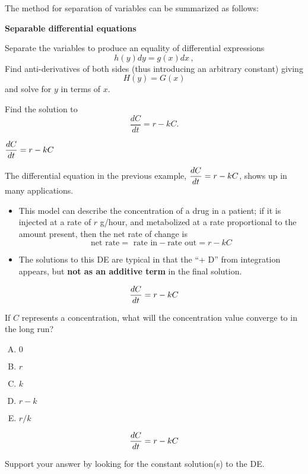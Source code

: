 \documentclass[12pt]{amsart}
\begin{document}
\newpage
{}
The method for separation of variables can be summarized as follows:

\begin{boxnote}
{\bf Separable differential equations}
\begin{center}
\begin{minipage}{0.9\linewidth}
 Separate the
 variables to produce an equality of differential expressions
 $$ h(y) dy =  g(x) dx\, , $$
 Find anti-derivatives of both sides (thus introducing an arbitrary
 constant) giving $$H(y)= G(x)$$ and solve for $y$ in terms of $x$.
\end{minipage}
\end{center}
\end{boxnote}

\newpage
{}
\begin{problem}
Find the solution to 
\[ \frac{dC}{dt} =  r - kC.
\]
 
\end{problem}

\newpage
\hfill
$\displaystyle \frac{dC}{dt} =  r - kC$


\newpage

The differential equation in the previous example, $\displaystyle \frac{dC}{dt} = r - kC$, shows up in many applications.
\begin{itemize}
\item This model can describe the concentration of a drug in a patient; if
it is injected at a rate of $r$ g/hour, and metabolized at a rate
proportional to the amount present, then the net rate of change is
$$\mbox{net rate} = \mbox{ rate in} - \mbox{rate out} = r - kC$$
\item The solutions to this DE are typical in that the ``+ D'' from
  integration appears, but {\bf not as an additive term} in the final
  solution.

\end{itemize}

\newpage
$$\displaystyle \frac{dC}{dt} = r - kC$$
\begin{problem}
If $C$ represents a concentration, what will the concentration value converge to in the long run? 

\begin{enumerate}[A.]
\item $0$ \\[1ex]
\item $r$ \\[1ex]
\item $k$ \\[1ex]
\item $r-k$ \\[1ex]
\item $r/k$
\end{enumerate}
\end{problem}

\newpage
$$\displaystyle \frac{dC}{dt} = r - kC$$
\begin{problem}
Support your answer by looking for the constant solution(s) to the DE.
\end{problem}
\end{document}
